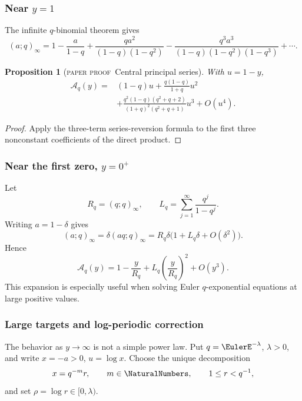 \documentclass[11pt,oneside]{article}
\newtheorem{proposition}[theorem]{Proposition}
\theoremstyle{definition}
\theoremstyle{remark}
\theoremstyle{plain}
\theoremstyle{definition}
\theoremstyle{remark}
\newcommand{\Aq}{\mathcal A_q}
\newcommand{\statusproved}{\textcolor{provedgreen}{\textsc{paper proof}}}
\numberwithin{equation}{section}
\numberwithin{figure}{section}
\numberwithin{table}{section}
\let\reportsubsubsection\subsubsection
\let\subsection\reportsubsubsection
\begin{document}
\subsection{Near \(y=1\)}
The infinite \(q\)-binomial theorem gives
\[
 (a;q)_\infty
 =1-\frac{a}{1-q}
 +\frac{q a^2}{(1-q)(1-q^2)}
 -\frac{q^3a^3}{(1-q)(1-q^2)(1-q^3)}+\cdots .
\]

\begin{proposition}[\statusproved\ Central principal series]
With \(u=1-y\),
\begin{equation}
\begin{split}
 \Aq(y)={}&(1-q)u
 +\frac{q(1-q)}{1+q}u^2\\
 &+\frac{q^2(1-q)(q^2+q+2)}{(1+q)^2(q^2+q+1)}u^3
 +O(u^4).
\end{split}
\label{eq:Aq-series-one}
\end{equation}
\end{proposition}
\begin{proof}
Apply the three-term series-reversion formula to the first three nonconstant
coefficients of the direct product.
\end{proof}

\subsection{Near the first zero, \(y=0^+\)}
Let
\[
 R_q=(q;q)_\infty,
 \qquad
 L_q=\sum_{j=1}^\infty\frac{q^j}{1-q^j}.
\]
Writing \(a=1-\delta\) gives
\[
 (a;q)_\infty
 =\delta(aq;q)_\infty
 =R_q\delta\bigl(1+L_q\delta+O(\delta^2)\bigr).
\]
Hence
\begin{equation}
 \Aq(y)=1-\frac{y}{R_q}
 +L_q\left(\frac{y}{R_q}\right)^2+O(y^3).
 \label{eq:Aq-near-zero}
\end{equation}
This expansion is especially useful when solving Euler \(q\)-exponential
equations at large positive values.

\subsection{Large targets and log-periodic correction}
The behavior as \(y\to\infty\) is not a simple power law.  Put
\(q=\EulerE^{-\lambda}\), \(\lambda>0\), and write \(x=-a>0\),
\(u=\log x\).  Choose the unique decomposition
\[
 x=q^{-m}r,
 \qquad m\in\NaturalNumbers,
 \qquad 1\le r<q^{-1},
\]
and set \(\rho=\log r\in[0,\lambda)\).
\end{document}
